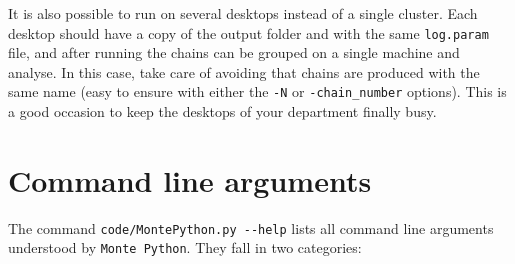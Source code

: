 \documentclass[10pt]{article}
\newcommand{\MP}{\texttt{Monte Python}}
\begin{document}
It is also possible to run on several desktops instead of a single cluster. Each desktop should have a copy of the output folder and with the same \verb?log.param? file, and after running the chains can be grouped on a single machine and analyse. In this case, take care of avoiding that chains are produced with the same name (easy to ensure with either the \verb?-N? or \verb?-chain_number? options). This is a good occasion to keep the desktops of your department finally busy.
     
\section{Command line arguments\label{commands}}

The command \verb?code/MontePython.py --help? lists all command line arguments understood by \MP. They fall in two categories:
\end{document}
